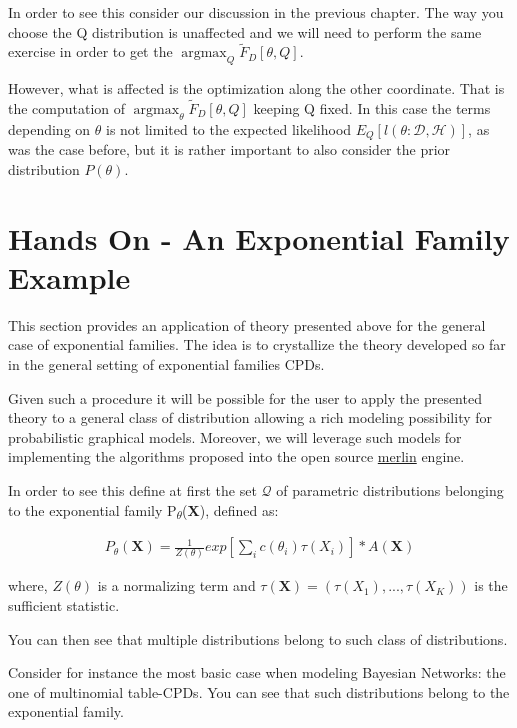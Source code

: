 \documentclass[11pt]{article}
\begin{document}
\begin{article}
In order to see this consider our discussion in the previous
chapter. The way you choose the Q distribution is unaffected and
we will need to perform the same exercise in order to get the
\(\operatorname*{argmax}_{Q} \tilde{F}_D[\theta, Q]\).

However, what is affected is the optimization along the other
coordinate. That is the computation of
\(\operatorname*{argmax}_{\theta} \tilde{F}_D[\theta, Q]\) keeping Q
fixed. In this case the terms depending on \(\theta\) is not limited to
the expected likelihood \(E_Q[l (\theta: \mathcal{D},
   \mathcal{H})]\), as was the case before, but it is rather important
to also consider the prior distribution \(P(\theta)\).

\newpage

\section{Hands On - An Exponential Family Example}
\label{examples}
This section provides an application of theory presented above for
the general case of exponential families. The idea is to
crystallize the theory developed so far in the general setting of
exponential families CPDs.

Given such a procedure it will be possible for the user to apply the
presented theory to a general class of distribution allowing a rich
modeling possibility for probabilistic graphical models. Moreover, we
will leverage such models for implementing the algorithms proposed
into the open source \href{https://github.com/radum2275/merlin}{merlin} engine.

In order to see this define at first the set \(\mathscr{Q}\) of
parametric distributions belonging to the exponential family
P\textsubscript{\(\theta\)}(\textbf{X}), defined as:

\begin{align} \label{eq:exponential-family}
P_{\theta}(\textbf{X}) = \frac{1}{Z(\theta)} exp[\sum_i c(\theta_i)\tau(X_i)] * A(\textbf{X})
\end{align}

where, \(Z(\theta)\) is a normalizing term and \(\tau(\textbf{X}) = (\tau(X_1),
  ..., \tau(X_K))\) is the sufficient statistic.

You can then see that multiple distributions belong to such class
of distributions.

Consider for instance the most basic case when modeling Bayesian
Networks: the one of multinomial table-CPDs. You can see that
such distributions belong to the exponential family.


\end{article}
\end{document}
